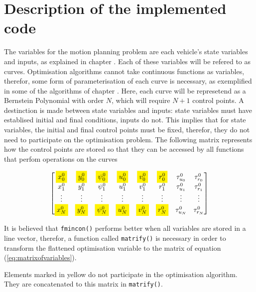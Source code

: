 \section{Description of the implemented code}

\par The variables for the motion planning problem are each vehicle's state variables and inputs, as explained in chapter \label{chap:autonomousvehiclemodels}. Each of these variables will be refered to as curves. Optimisation algorithms cannot take continuous functions as variables, therefor, some form of parameterisation of each curve is necessary, as exemplified in some of the algorithms of chapter \label{chap:theory}. Here, each curve will be represetend as a Bernstein Polynomial with order $N$, which will require $N+1$ control points. A destinction is made between state variables and inputs: state variables must have establised initial and final conditions, inputs do not. This implies that for state variables, the initial and final control points must be fixed, therefor, they do not need to participate on the optimisation problem. The following matrix represents how the control points are stored so that they can be accessed by all functions that perfom operations on the curves

\begin{equation}
    \begin{bmatrix}
        \colorbox{yellow}{$\displaystyle x_0^0$} & \colorbox{yellow}{$\displaystyle y_0^0$} & \colorbox{yellow}{$\displaystyle \psi_0^0$} & \colorbox{yellow}{$\displaystyle u_0^0$} & \colorbox{yellow}{$\displaystyle v_0^0$} & \colorbox{yellow}{$\displaystyle r_0^0$} & \tau_{u_0}^0 & \tau_{r_0}^0 \\
        x_1^0 & y_1^0 & \psi_1^0 & u_1^0 & v_1^0 & r_1^0 & \tau_{u_1}^0 & \tau_{r_1}^0 \\
        \vdots & \vdots & \vdots & \vdots & \vdots & \vdots & \vdots & \vdots \\
        \colorbox{yellow}{$x_{N}^0$} & \colorbox{yellow}{$y_{N}^0$} & \colorbox{yellow}{$\psi_{N}^0$} & \colorbox{yellow}{$u_{N}^0$} & \colorbox{yellow}{$v_{N}^0$} & \colorbox{yellow}{$r_{N}^0$} & \tau_{u_{N}}^0 & \tau_{r_{N}}^0
    \end{bmatrix}
    \label{eq:matrixofvariables}
\end{equation}

\par It is believed  that \texttt{fmincon()} performs better when all variables are stored in a line vector, therefor, a function called \texttt{matrify()} is necessary in order to transform the flattened optimisation variable to the matrix of equation (\ref{eq:matrixofvariables}). 
\par Elements marked in yellow do not participate in the optimisation algorithm. They are concatenated to this matrix in \texttt{matrify()}. 

